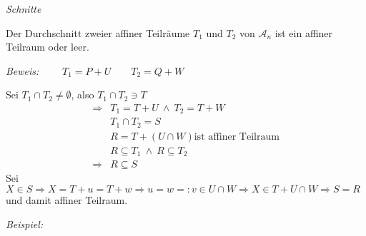 \begin{mysatz}\label{Schnitte}\textit{Schnitte}\medskip

    Der Durchschnitt zweier affiner Teilräume $T_1$ und $T_2$ von $\mathcal{A}_n$ ist ein affiner Teilraum oder leer.\medskip

    \textit{Beweis:} $\qquad T_1 = P + U \qquad T_2 = Q + W$\medskip

    Sei $T_1 \cap T_2 \neq \emptyset$, also $T_1 \cap T_2 \ni T$
    \begin{align*}
        \Rightarrow & T_1 = T + U \ \wedge \ T_2 = T + W\\
        & T_1 \cap T_2 = S\\
        & R = T + \left( U \cap W \right) \text{ist affiner Teilraum}\\
        & R \subseteq T_1 \ \wedge \ R \subseteq T_2\\
        \Rightarrow & R \subseteq S
    \end{align*}
    Sei $X \in S \Rightarrow X = T + u = T + w \Rightarrow u = w =: v \in U \cap W \Rightarrow X \in T + U \cap W \Rightarrow S = R$ und damit affiner Teilraum.
\end{mysatz}

\textit{Beispiel:}\medskip

